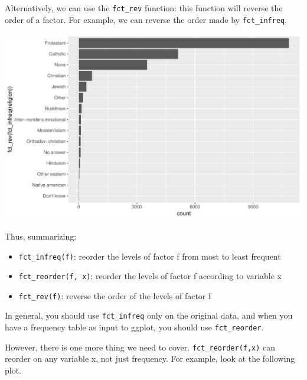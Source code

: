 \documentclass[]{tufte-book}
\newenvironment{Shaded}{}{}
\newcommand{\KeywordTok}[1]{\textcolor[rgb]{0.00,0.44,0.13}{\textbf{#1}}}
\newcommand{\StringTok}[1]{\textcolor[rgb]{0.25,0.44,0.63}{#1}}
\newcommand{\OperatorTok}[1]{\textcolor[rgb]{0.40,0.40,0.40}{#1}}
\newcommand{\NormalTok}[1]{#1}
\providecommand{\tightlist}{%
  \setlength{\itemsep}{0pt}\setlength{\parskip}{0pt}}
\begin{document}
Alternatively, we can use the \texttt{fct\_rev} function: this function
will reverse the order of a factor. For example, we can reverse the
order made by \texttt{fct\_infreq}.

\begin{Shaded}
\end{Shaded}

\includegraphics{cleaning_tutorial_files/figure-latex/unnamed-chunk-87-1}

Thus, summarizing:

\begin{itemize}
\tightlist
\item
  \texttt{fct\_infreq(f)}: reorder the levels of factor f from most to
  least frequent
\item
  \texttt{fct\_reorder(f,\ x)}: reorder the levels of factor f according
  to variable x
\item
  \texttt{fct\_rev(f)}: reverse the order of the levels of factor f
\end{itemize}

In general, you should use \texttt{fct\_infreq} only on the original
data, and when you have a frequency table as input to ggplot, you should
use \texttt{fct\_reorder}.

However, there is one more thing we need to cover.
\texttt{fct\_reorder(f,x)} can reorder on any variable x, not just
frequency. For example, look at the following plot.
\end{document}
